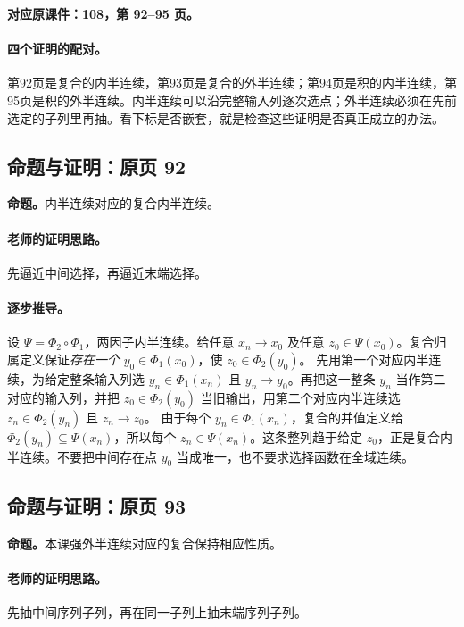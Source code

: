 \documentclass[11pt,a4paper]{article}
\theoremstyle{definition}\newtheorem{definition}{定义}\newtheorem{example}{例}
\begin{document}
\textbf{对应原课件：108，第 92--95 页。}


\paragraph{四个证明的配对。}
第92页是复合的内半连续，第93页是复合的外半连续；第94页是积的内半连续，第95页是积的外半连续。内半连续可以沿完整输入列逐次选点；外半连续必须在先前选定的子列里再抽。看下标是否嵌套，就是检查这些证明是否真正成立的办法。


\subsection{命题与证明：原页 92}

\textbf{命题。}内半连续对应的复合内半连续。

\paragraph{老师的证明思路。}先逼近中间选择，再逼近末端选择。

\paragraph{逐步推导。}
设 $\Psi=\Phi_2\circ\Phi_1$，两因子内半连续。给任意 $x_n\to x_0$ 及任意 $z_0\in\Psi(x_0)$。复合归属定义保证\emph{存在一个} $y_0\in\Phi_1(x_0)$，使 $z_0\in\Phi_2(y_0)$。
先用第一个对应内半连续，为给定整条输入列选 $y_n\in\Phi_1(x_n)$ 且 $y_n\to y_0$。再把这一整条 $y_n$ 当作第二对应的输入列，并把 $z_0\in\Phi_2(y_0)$ 当旧输出，用第二个对应内半连续选 $z_n\in\Phi_2(y_n)$ 且 $z_n\to z_0$。
由于每个 $y_n\in\Phi_1(x_n)$，复合的并值定义给 $\Phi_2(y_n)\subseteq\Psi(x_n)$，所以每个 $z_n\in\Psi(x_n)$。这条整列趋于给定 $z_0$，正是复合内半连续。不要把中间存在点 $y_0$ 当成唯一，也不要求选择函数在全域连续。


\subsection{命题与证明：原页 93}

\textbf{命题。}本课强外半连续对应的复合保持相应性质。

\paragraph{老师的证明思路。}先抽中间序列子列，再在同一子列上抽末端序列子列。
\end{document}
